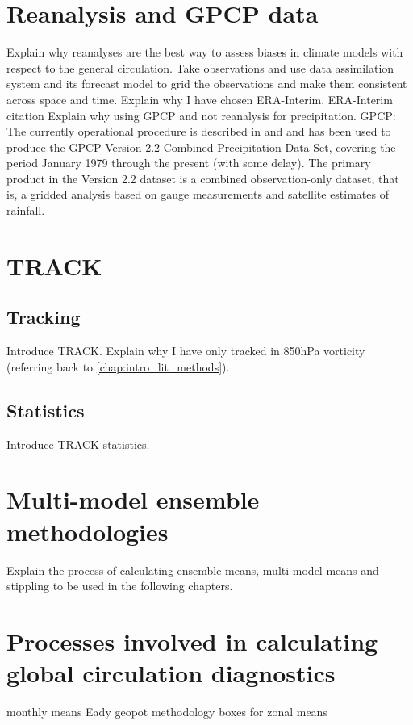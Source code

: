 \section{Reanalysis and GPCP data}
\label{chap:method_obsdata}
Explain why reanalyses are the best way to assess biases in climate models with respect to the general circulation. Take observations and use data assimilation system and its forecast model to grid the observations and make them consistent across space and time. Explain why I have chosen ERA-Interim. ERA-Interim citation \cite{Dee2011}
Explain why using GPCP and not reanalysis for precipitation. GPCP: The currently operational procedure is described in \cite{Adler2003} and \cite{Huffman2009} and has been used to produce the GPCP Version 2.2 Combined Precipitation Data Set, covering the period January 1979 through the present (with some delay). The primary product in the Version 2.2 dataset is a combined observation-only dataset, that is, a gridded analysis based on gauge measurements and satellite estimates of rainfall.
\section{TRACK}
\label{chap:method_TRACK}
\subsection{Tracking}
Introduce TRACK.
Explain why I have only tracked in 850hPa vorticity (referring back to \ref{chap:intro_lit_methods}).
\subsection{Statistics}
Introduce TRACK statistics.
\section{Multi-model ensemble methodologies}
\label{chap:method_means}
Explain the process of calculating ensemble means, multi-model means and stippling to be used in the following chapters.
\section{Processes involved in calculating global circulation diagnostics}
\label{chap:method_globalcirc}
monthly means
Eady
geopot methodology
boxes for zonal means
